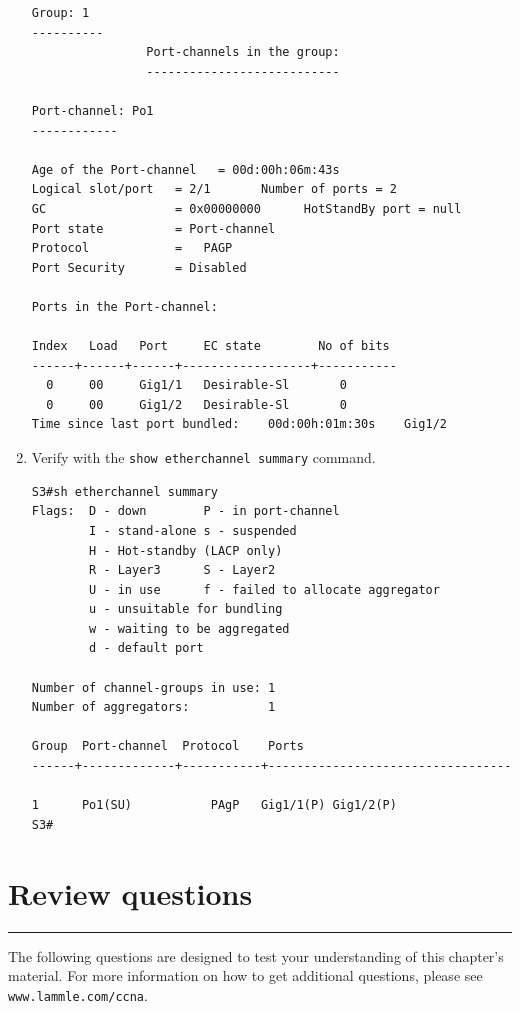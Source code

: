 \begin{enumerate}
\begin{verbatim}
Group: 1
----------
                Port-channels in the group:
                ---------------------------
 
Port-channel: Po1
------------
 
Age of the Port-channel   = 00d:00h:06m:43s
Logical slot/port   = 2/1       Number of ports = 2
GC                  = 0x00000000      HotStandBy port = null
Port state          = Port-channel
Protocol            =   PAGP
Port Security       = Disabled
 
Ports in the Port-channel:
 
Index   Load   Port     EC state        No of bits
------+------+------+------------------+-----------
  0     00     Gig1/1   Desirable-Sl       0
  0     00     Gig1/2   Desirable-Sl       0
Time since last port bundled:    00d:00h:01m:30s    Gig1/2
\end{verbatim}
\item
  Verify with the \texttt{show\ etherchannel\ summary} command.

\begin{verbatim}
S3#sh etherchannel summary
Flags:  D - down        P - in port-channel
        I - stand-alone s - suspended
        H - Hot-standby (LACP only)
        R - Layer3      S - Layer2
        U - in use      f - failed to allocate aggregator
        u - unsuitable for bundling
        w - waiting to be aggregated
        d - default port
 
Number of channel-groups in use: 1
Number of aggregators:           1
 
Group  Port-channel  Protocol    Ports
------+-------------+-----------+----------------------------------
 
1      Po1(SU)           PAgP   Gig1/1(P) Gig1/2(P)
S3#
\end{verbatim}
\end{enumerate}

\section{Review questions}

\begin{center}\rule{0.5\linewidth}{0.5pt}\end{center}

The following questions are designed to
test your understanding of this chapter's material. For more information
on how to get additional questions, please see
\texttt{www.lammle.com/ccna}.

